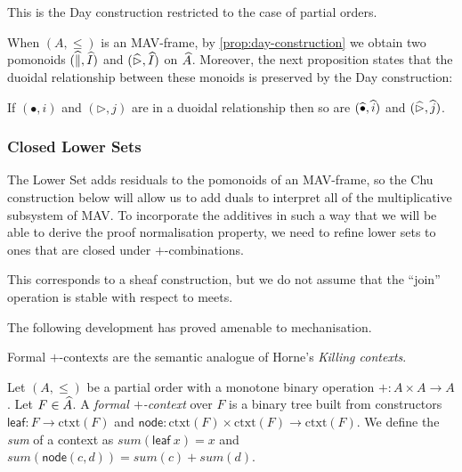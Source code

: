 \begin{remark}
  This is the Day construction \cite{day} restricted to the case of
  partial orders.
\end{remark}

\begin{remark}
  When $(A, \leq)$ is an MAV-frame, by \ref{prop:day-construction} we
  obtain two pomonoids $(\mathop{\widehat{\parallel}}, \mathop{\widehat{I}})$ and
  $(\mathop{\widehat{\rhd}}, \mathop{\widehat{I}})$ on $\widehat{A}$. Moreover, the next
  proposition states that the duoidal relationship between these
  monoids is preserved by the Day construction:
\end{remark}

\begin{proposition}\label{prop:lower-set-duoidal}
  If $(\bullet, i)$ and $(\rhd, j)$ are in a duoidal relationship then
  so are $(\mathop{\widehat{\bullet}}, \mathop{\widehat{i}})$ and $(\mathop{\widehat{\rhd}}, \mathop{\widehat{j}})$.
\end{proposition}

\subsubsection{Closed Lower Sets}

\newcommand{\ClosedLowerSet}[1]{\widehat{#1}^+}
\newcommand{\ClosedDay}[1]{\mathop{\widehat{#1}^+}}
\newcommand{\Chu}{\mathrm{Chu}}
\newcommand{\op}{\mathrm{op}}

The Lower Set adds residuals to the pomonoids of an MAV-frame, so the
Chu construction below will allow us to add duals to interpret all of
the multiplicative subsystem of MAV. To incorporate the additives in
such a way that we will be able to derive the proof normalisation
property, we need to refine lower sets to ones that are closed under
$+$-combinations.

This corresponds to a sheaf construction, but we do not assume that
the ``join'' operation is stable with respect to meets.

The following development has proved amenable to mechanisation.

Formal $+$-contexts are the semantic analogue of Horne's \emph{Killing
  contexts}.

\begin{definition}
  Let $(A, \leq)$ be a partial order with a monotone binary operation
  $+ : A \times A \to A$.  Let $F \in \widehat{A}$. A \emph{formal
    $+$-context} over $F$ is a binary tree built from constructors
  $\mathsf{leaf} : F \to \mathrm{ctxt}(F)$ and
  $\mathsf{node} : \mathrm{ctxt}(F) \times \mathrm{ctxt}(F) \to
  \mathrm{ctxt}(F)$. We define the \emph{sum} of a context as
  $\mathit{sum}(\mathsf{leaf}~x) = x$ and
  $\mathit{sum}(\mathsf{node}(c,d)) = \mathit{sum}(c) +
  \mathit{sum}(d)$.
\end{definition}

